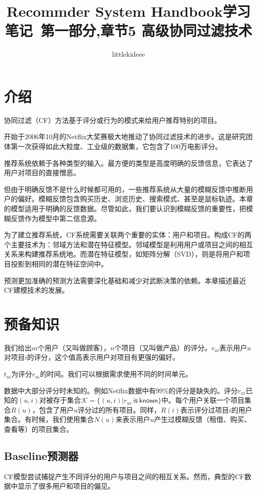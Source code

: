 \documentclass{article}
\begin{document}
 \title{Recommder System Handbook学习笔记\ 第一部分,章节5 高级协同过滤技术}
 \author{littlekideee}
 \maketitle

 \section{介绍}
 协同过滤（CF）方法基于评分或行为的模式来给用户推荐特别的项目。

 开始于2006年10月的Netflix大奖赛极大地推动了协同过滤技术的进步。这是研究团体第一次获得如此大粒度、工业级的数据集，它包含了100万电影评分。

 推荐系统依赖于各种类型的输入。最方便的类型是高度明确的反馈信息，它表达了用户对项目的直接憎恶。

 但由于明确反馈不是什么时候都可用的，一些推荐系统从大量的模糊反馈中推断用户的偏好。模糊反馈包含购买历史、浏览历史、搜索模式、甚至是鼠标轨迹。本章的模型适用于明确的反馈数据。尽管如此，我们要认识到模糊反馈的重要性，把模糊反馈作为模型中第二信息源。

 为了建立推荐系统，CF系统需要关联两个重要的实体：用户和项目。构成CF的两个主要技术为：邻域方法和潜在特征模型。邻域模型是利用用户或项目之间的相互关系来构建推荐系统地。而潜在特征模型，如矩阵分解（SVD），则是将用户和项目投影到相同的潜在特征空间中。

 预测更加准确的预测方法需要深化基础和减少对武断决策的依赖。本章描述最近CF建模技术的发展。

 \section{预备知识}
 我们给出$m$个用户（又叫做顾客），$n$个项目（又叫做产品）的评分。$r_{ui}$表示用户$u$对项目$i$的评分，这个值高表示用户对项目有更强的偏好。

 $t_{ui}$为评分$r_{ui}$的时间。我们可以根据需求使用不同的时间单元。

 数据中大部分评分时未知的。例如Netflix数据中有99\%的评分是缺失的。评分$r_{ui}$已知的$(u,i)$对被存于集合$\mathcal{K}=\{(u,i)|r_{ui}\ \mathsf{is\ known}\}$中。每个用户关联一个项目集合$R(u)$，包含了用户$u$评分过的所有项目。同样，$R(i)$表示评分过项目$i$的用户集合。有时候，我们使用集合$N(u)$来表示用户$u$产生过模糊反馈（租借、购买、查看等）的项目集合。

 \subsection{Baseline预测器}
 CF模型尝试捕捉产生不同评分的用户与项目之间的相互关系。然而，典型的CF数据中显示了很多用户和项目的偏见。
\end{document}
